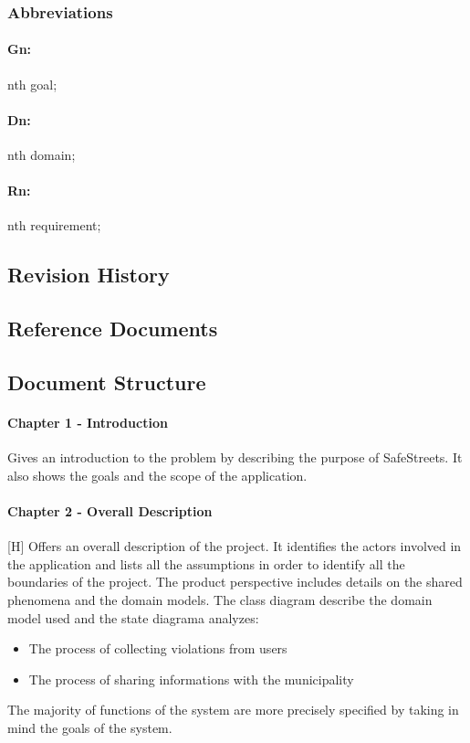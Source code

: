 \documentclass{article}
\begin{document}
\subsubsection{Abbreviations}
\paragraph{Gn:} nth goal; \paragraph{Dn:} nth domain; \paragraph{Rn:} nth
requirement;
\subsection{Revision History}
\subsection{Reference Documents}
\subsection{Document Structure}
\paragraph{Chapter 1 - Introduction}
Gives an introduction to the problem by describing the purpose of SafeStreets.
It also shows the goals and the scope of the application. 
\paragraph{Chapter 2 - Overall Description}[H]
Offers an overall description of the project. It identifies the actors involved
in the application and lists all the assumptions in order to identify all the
boundaries of the project. The product perspective includes details on the
shared phenomena and the domain models. The class diagram describe the domain
model used and the state diagrama analyzes:
\begin{itemize}
    \item The process of collecting violations from users
    \item The process of sharing informations with the municipality
\end{itemize}
The majority of functions of the system are more precisely specified by taking
in mind the goals of the system.  
\end{document}
